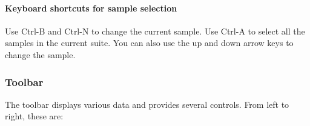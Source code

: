 \documentclass[a4paper]{article}
\newcommand{\ppcmd}[1]{\textsf{#1}} %
\begin{document}
\paragraph{Keyboard shortcuts for sample selection}

Use \ppcmd{Ctrl-B} and \ppcmd{Ctrl-N} to change the current sample. Use
\ppcmd{Ctrl-A} to select all the samples in the current suite. You can also
use the up and down arrow keys to change the sample.

\subsubsection{\label{sec:manual-toolbar}Toolbar}

The toolbar displays various data and provides several controls.
From left to right, these are:
\end{document}
